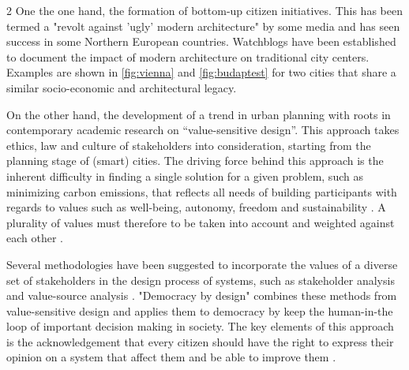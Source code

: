 \documentclass{article}
\begin{document}
\begin{multicols}{2}
One the one hand, the formation of bottom-up citizen initiatives. This has been termed a "revolt against 'ugly' modern architecture" by some media \cite{gersten_scandinavian_2023} and has seen success in some Northern European countries. Watchblogs have been established to document the impact of modern architecture on traditional city centers. Examples are shown in \cref{fig:vienna} and \cref{fig:budaptest} for two cities that share a similar socio-economic and architectural legacy.

On the other hand, the development of a trend in urban planning with roots in contemporary academic research on “value-sensitive design”. This approach takes ethics, law and culture of stakeholders into consideration, starting from the planning stage of (smart) cities. The driving force behind this approach is the inherent difficulty in finding a single solution for a given problem, such as minimizing carbon emissions, that reflects all needs of building participants with regards to values such as well-being, autonomy, freedom and sustainability \cite{helbing_ethics_2021}. A plurality of values must therefore to be taken into account and weighted against each other \cite{stiglitz_gdp_2020}.

Several methodologies have been suggested to incorporate the values of a diverse set of stakeholders in the design process of systems, such as stakeholder analysis \cite{friedman_value_2019} and value-source analysis \cite{friedman_value_2019}.
"Democracy by design" \cite{helbing_ethics_2021}\cite{helbing_democracy_2023} combines these methods from value-sensitive design and applies them to democracy by keep the human-in-the loop of important decision making in society. The key elements of this approach is the acknowledgement that every citizen should have the right to express their opinion on a system that affect them and be able to improve them \cite{helbing_ethics_2021}.
\end{multicols}
\vspace{-5mm}
\end{document}
